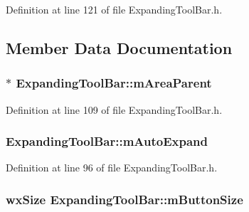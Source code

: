 Definition at line 121 of file Expanding\+Tool\+Bar.\+h.



\subsection{Member Data Documentation}
\subsubsection[{\texorpdfstring{m\+Area\+Parent}{mAreaParent}}]{$\ast$ Expanding\+Tool\+Bar\+::m\+Area\+Parent\hspace{0.3cm}{\ttfamily [protected]}}\hypertarget{class_expanding_tool_bar_a2e13d63d7c88d42b3179c90afffa0971}{}\label{class_expanding_tool_bar_a2e13d63d7c88d42b3179c90afffa0971}


Definition at line 109 of file Expanding\+Tool\+Bar.\+h.

\subsubsection[{\texorpdfstring{m\+Auto\+Expand}{mAutoExpand}}]{ Expanding\+Tool\+Bar\+::m\+Auto\+Expand\hspace{0.3cm}{\ttfamily [protected]}}\hypertarget{class_expanding_tool_bar_a328da4105eaf5e813a93a3c03649c618}{}\label{class_expanding_tool_bar_a328da4105eaf5e813a93a3c03649c618}


Definition at line 96 of file Expanding\+Tool\+Bar.\+h.

\subsubsection[{\texorpdfstring{m\+Button\+Size}{mButtonSize}}]{\setlength{\rightskip}{0pt plus 5cm}wx\+Size Expanding\+Tool\+Bar\+::m\+Button\+Size\hspace{0.3cm}{\ttfamily [protected]}}\hypertarget{class_expanding_tool_bar_a886f2d113ee6ba34fbca0644c93f2664}{}\label{class_expanding_tool_bar_a886f2d113ee6ba34fbca0644c93f2664}


